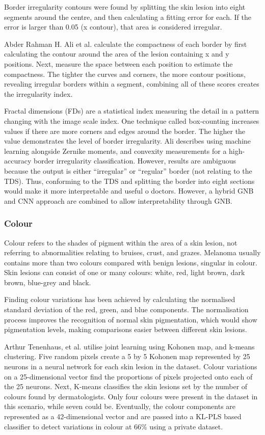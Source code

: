 Border irregularity contours were found by splitting the skin lesion into eight segments around the centre, and then calculating a fitting error for each. If the error is larger than 0.05 (x contour), that area is considered irregular\cite{Kasmi2016}.

Abder Rahman H. Ali et al. calculate the compactness of each border by first calculating the contour around the area of the lesion containing x and y positions. Next, measure the space between each position to estimate the compactness. The tighter the curves and corners, the more contour positions, revealing irregular borders within a segment, combining all of these scores creates the irregularity index\cite{Zaqout2016}.

Fractal dimensions (FDs) are a statistical index measuring the detail in a pattern changing with the image scale index. One technique called box-counting increases values if there are more corners and edges around the border. The higher the value demonstrates the level of border irregularity. Ali describes using machine learning alongside Zernike moments, and convexity measurements for a high-accuracy border irregularity classification\cite{Ali2020b}. However, results are ambiguous because the output is either ``irregular'' or ``regular'' border (not relating to the TDS). Thus, conforming to the TDS and splitting the border into eight sections would make it more interpretable and useful o doctors. However, a hybrid GNB and CNN approach are combined to allow interpretability through GNB.

\subsubsection{Colour}
Colour refers to the shades of pigment within the area of a skin lesion, not referring to abnormalities relating to bruises, crust, and grazes. Melanoma usually contains more than two colours compared with benign lesions, singular in colour. Skin lesions can consist of one or many colours: white, red, light brown, dark brown, blue-grey and black.

Finding colour variations has been achieved by calculating the normalised standard deviation of the red, green, and blue components\cite{She2007}. The normalisation process improves the recognition of normal skin pigmentation, which would show pigmentation levels, making comparisons easier between different skin lesions.

Arthur Tenenhaus, et al. utilise joint learning using Kohonen map, and k-means clustering\cite{Tenenhaus2010}. Five random pixels create a 5 by 5 Kohonen map represented by 25 neurons in a neural network for each skin lesion in the dataset. Colour variations on a 25-dimensional vector find the proportions of pixels projected onto each of the 25 neurons. Next, K-means classifies the skin lesions set by the number of colours found by dermatologists. Only four colours were present in the dataset in this scenario, while seven could be. Eventually, the colour components are represented as a 42-dimensional vector and are passed into a KL-PLS based classifier to detect variations in colour at 66\% using a private dataset.

